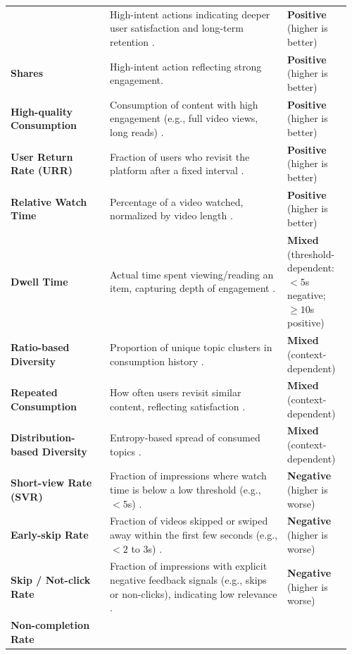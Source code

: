 \documentclass[manuscript,review,screen]{acmart}
\begin{document}
\begin{table}[H]
\begin{tabularx}{\linewidth}{>{\raggedright\arraybackslash}p{0.28\linewidth} >{\raggedright\arraybackslash}p{0.50\linewidth} >{\raggedright\arraybackslash}p{0.18\linewidth}}
    & High-intent actions indicating deeper user satisfaction and long-term retention \cite{mcdonald2023impatient}.
    & \textbf{Positive} (higher is better) \\
\textbf{Shares}
    & High-intent action reflecting strong engagement.
    & \textbf{Positive} (higher is better) \\
\textbf{High-quality Consumption}
    & Consumption of content with high engagement (e.g., full video views, long reads) \cite{wang2022surrogate}.
    & \textbf{Positive} (higher is better) \\
\textbf{User Return Rate (URR)}
    & Fraction of users who revisit the platform after a fixed interval \cite{wu2017returning}.
    & \textbf{Positive} (higher is better) \\
\textbf{Relative Watch Time}
    & Percentage of a video watched, normalized by video length \cite{wu2018beyond}.
    & \textbf{Positive} (higher is better) \\
\textbf{Dwell Time}
    & Actual time spent viewing/reading an item, capturing depth of engagement \cite{yi2014beyond}.
    & \textbf{Mixed} (threshold-dependent: $<5$s negative; $\geq10$s positive) \\
\textbf{Ratio-based Diversity}
    & Proportion of unique topic clusters in consumption history \cite{wang2022surrogate}.
    & \textbf{Mixed} (context-dependent) \\
\textbf{Repeated Consumption}
    & How often users revisit similar content, reflecting satisfaction \cite{wang2022surrogate}.
    & \textbf{Mixed} (context-dependent) \\
\textbf{Distribution-based Diversity}
    & Entropy-based spread of consumed topics \cite{wang2022surrogate}.
    & \textbf{Mixed} (context-dependent) \\
\textbf{Short-view Rate (SVR)}
    & Fraction of impressions where watch time is below a low threshold (e.g., $<5$s) \cite{pan2023learning}.
    & \textbf{Negative} (higher is worse) \\
\textbf{Early-skip Rate}
    & Fraction of videos skipped or swiped away within the first few seconds (e.g., $<2$ to $3$s) \cite{pan2023learning}.
    & \textbf{Negative} (higher is worse) \\
\textbf{Skip / Not-click Rate}
    & Fraction of impressions with explicit negative feedback signals (e.g., skips or non-clicks), indicating low relevance \cite{zhao2018recommendations}.
    & \textbf{Negative} (higher is worse) \\
\textbf{Non-completion Rate}

\end{tabularx}
\end{table}
\end{document}
